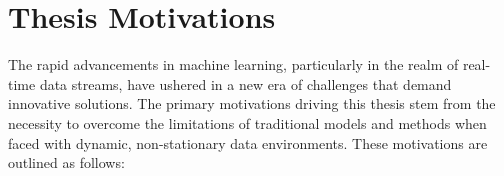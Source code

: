 
\section{Thesis Motivations}
\label{sec:1_introduction_motivation}
The rapid advancements in machine learning, particularly in the realm of real-time data streams, have ushered in a new era of challenges that demand innovative solutions. The primary motivations driving this thesis stem from the necessity to overcome the limitations of traditional models and methods when faced with dynamic, non-stationary data environments. These motivations are outlined as follows:

